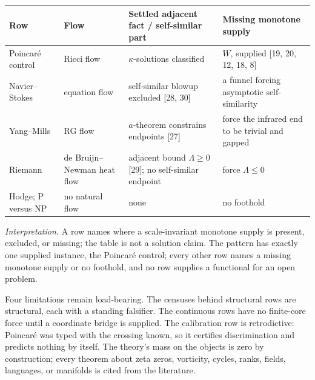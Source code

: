 \documentclass[10pt,twocolumn]{article}
\begin{document}
\begin{table}[!tbp]
\smaller
\centering
\begin{tabular}{@{}
  >{\raggedright\arraybackslash}p{}
  >{\raggedright\arraybackslash}p{}
  >{\raggedright\arraybackslash}p{}
  >{\raggedright\arraybackslash}p{}@{}}

\toprule\noalign{}
\begin{minipage}[b]{\linewidth}\raggedright
Row
\end{minipage} & \begin{minipage}[b]{\linewidth}\raggedright
Flow
\end{minipage} & \begin{minipage}[b]{\linewidth}\raggedright
Settled adjacent fact / self-similar part
\end{minipage} & \begin{minipage}[b]{\linewidth}\raggedright
Missing monotone supply
\end{minipage} \\
\midrule\noalign{}
\bottomrule\noalign{}
Poincaré control & Ricci flow & \(\kappa\)-solutions classified & \(W\),
supplied {[}19, 20, 12, 18, 8{]} \\
Navier--Stokes & equation flow & self-similar blowup excluded {[}28,
30{]} & a funnel forcing asymptotic self-similarity \\
Yang--Mills & RG flow & \(a\)-theorem constrains endpoints {[}27{]} &
force the infrared end to be trivial and gapped \\
Riemann & de Bruijn--Newman heat flow & adjacent bound \(\Lambda \ge 0\)
{[}29{]}; no self-similar endpoint & force \(\Lambda \le 0\) \\
Hodge; P versus NP & no natural flow & none & no foothold \\
\bottomrule
\end{tabular}
\end{table}

\emph{Interpretation.} A row names where a scale-invariant monotone
supply is present, excluded, or missing; the table is not a solution
claim. The pattern has exactly one supplied instance, the Poincaré
control; every other row names a missing monotone supply or no foothold,
and no row supplies a functional for an open problem.

Four limitations remain load-bearing. The censuses behind structural
rows are structural, each with a standing falsifier. The continuous rows
have no finite-core force until a coordinate bridge is supplied. The
calibration row is retrodictive: Poincaré was typed with the crossing
known, so it certifies discrimination and predicts nothing by itself.
The theory's mass on the objects is zero by construction; every theorem
about zeta zeros, vorticity, cycles, ranks, fields, languages, or
manifolds is cited from the literature.
\end{document}
